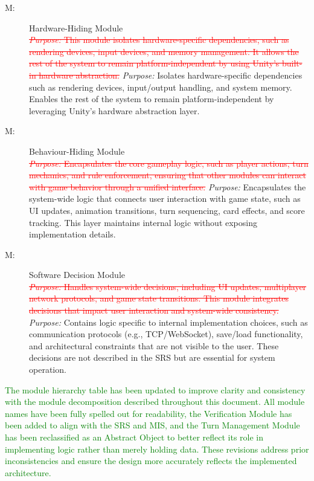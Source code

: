 \documentclass[12pt, titlepage]{article}
\newcommand{\removed}[1]{\textcolor{red}{\sout{#1}}}
\newcommand{\added}[1]{\textcolor{green}{#1}}
\newcounter{mnum}
\newcommand{\mthemnum}{M\themnum}
\begin{document}
\begin{description}
\item[ \mthemnum \label{mHH}:] Hardware-Hiding Module \\
  \removed{\textit{Purpose:} This module isolates hardware-specific dependencies, such as rendering devices, input devices, and memory management. It allows the rest of the system to remain platform-independent by using Unity's built-in hardware abstraction.}
  \textit{Purpose:} Isolates hardware-specific dependencies such as rendering devices, input/output handling, and system memory. Enables the rest of the system to remain platform-independent by leveraging Unity's hardware abstraction layer.

\item[ \mthemnum \label{mBH}:] Behaviour-Hiding Module \\
  \removed{\textit{Purpose:} Encapsulates the core gameplay logic, such as player actions, turn mechanics, and rule enforcement, ensuring that other modules can interact with game behavior through a unified interface.}
  \textit{Purpose:} Encapsulates the system-wide logic that connects user interaction with game state, such as UI updates, animation transitions, turn sequencing, card effects, and score tracking. This layer maintains internal logic without exposing implementation details.

\item[ \mthemnum \label{mSD}:] Software Decision Module \\
  \removed{\textit{Purpose:} Handles system-wide decisions, including UI updates, multiplayer network protocols, and game state transitions. This module integrates decisions that impact user interaction and system-wide consistency.}
  \textit{Purpose:} Contains logic specific to internal implementation choices, such as communication protocols (e.g., TCP/WebSocket), save/load functionality, and architectural constraints that are not visible to the user. These decisions are not described in the SRS but are essential for system operation.
\end{description}

\newpage

\added{The module hierarchy table has been updated to improve clarity and consistency with the module decomposition described throughout this document. All module names have been fully spelled out for readability, the Verification Module has been added to align with the SRS and MIS, and the Turn Management Module has been reclassified as an Abstract Object to better reflect its role in implementing logic rather than merely holding data. These revisions address prior inconsistencies and ensure the design more accurately reflects the implemented architecture.}
\end{document}
